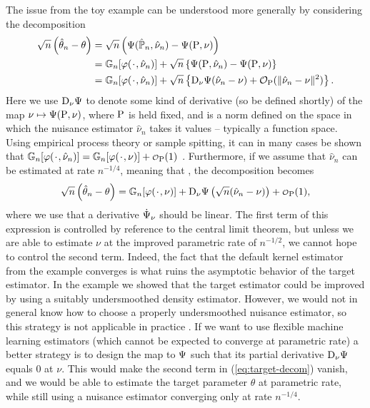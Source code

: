 \documentclass[a4,danish]{article}
\begin{document}
  The issue from the toy example can be understood more generally by
  considering the decomposition
\begin{align*}
  \sqrt{n}
  \left(
  \hat{\theta}_n - \theta
  \right)
  & =  \sqrt{n}
    \left(
    \TT(\empmeas,\hat{\nu}_n) - \TT(\P,\nu)
    \right) \\
  & =
    \G{\phi( \blank, \hat{\nu}_n)}
    + \sqrt{n}
    \left\{
    \TT(\P,\hat{\nu}_n) - \TT(\P,\nu)
    \right\}
  \\
  & = \G{\phi( \blank, \hat{\nu}_n)}
    + \sqrt{n}
    \left\{
    \mathrm{D}_{\nu}{\TT}(\hat{\nu}_n - \nu)
    + \mathcal{O}_{\P}(\Vert \hat{\nu}_n - \nu \Vert^2)
    \right\}.
\end{align*}
Here we use $\mathrm{D}_{\nu}{\TT}$ to denote some kind of derivative (so be defined shortly) of the
map $\nu \mapsto \TT(\P, \nu)$, where $\P$ is held fixed, and  is a norm defined on the space in which the
nuisance estimator $\hat{\nu}_n$ takes it values -- typically a function space. Using empirical
process theory or sample spitting, it can in many cases be shown that $\G{\phi( \blank, \hat{\nu}_n)} = \G{\phi( \blank, \nu)} + \smallO_{\P}(1)$
\citep{van1996weak,van2000asymptotic,chernozhukov2018double}. Furthermore, if we assume that
$\hat{\nu}_n$ can be estimated at rate $n^{-1/4}$, meaning that  , the decomposition becomes
\begin{equation}
  \label{eq:target-decom}
  \sqrt{n}
  \left(
    \hat{\theta}_n - \theta
  \right)
  = \G{\phi( \blank, \nu)}
  + \mathrm{D}_{\nu}{\TT}
  \left(
    \sqrt{n}(\hat{\nu}_n - \nu)
  \right)
  + \smallO_{\P}(1),
\end{equation}
where we use that a derivative $\dot{\TT}_{\nu}$ should be linear. The
first term of this expression is controlled by reference to the
central limit theorem, but unless we are able to estimate $\nu$ at the
improved parametric rate of $n^{-1/2}$, we cannot hope to control the
second term. Indeed, the fact that the default kernel estimator from
the example converges  is what
ruins the asymptotic behavior of the target estimator.  In the example
we showed that the target estimator could be improved by using a
suitably undersmoothed density estimator. However, we would not in
general know how to choose a properly undersmoothed nuisance
estimator, so this strategy is not applicable in practice . If we want to use flexible
machine learning estimators (which cannot be expected to converge at
parametric rate) a better strategy is to design the map to $\TT$ such
that its partial derivative $\mathrm{D}_{\nu}{\TT}$ equals 0 at
$\nu$. This would make the second term in (\ref{eq:target-decom})
vanish, and we would be able to estimate the target parameter $\theta$
at parametric rate, while still using a nuisance estimator converging
only at rate $n^{-1/4}$.
\end{document}
